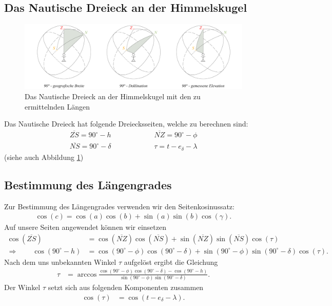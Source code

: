 \begin{refsection}
\subsection{Das Nautische Dreieck an der Himmelskugel}
%
\begin{figure}
\centering
\includegraphics[width=1\textwidth]{kugel/Bestimmung.jpg}
\caption{Das Nautische Dreieck an der Himmelskugel mit den zu
ermittelnden Längen}
\label{NautischeDreieck}
\end{figure}
%
%
Das Nautische Dreieck hat folgende Dreiecksseiten, welche zu berechnen
sind:
\begin{align*}
\overline{ZS} = 90^{\circ} - h \quad \quad \quad \quad \quad \quad 
\overline{NZ} = 90^{\circ} - \phi \\
\overline{NS} = 90^{\circ} - \delta \quad \quad \quad \quad \quad \quad 
\tau = t - e_\delta - \lambda 
\end{align*}
(siehe auch Abbildung \ref{NautischeDreieck})

\subsection{Bestimmung des Längengrades} \label{BestimmungL} 
Zur Bestimmung des Längengrades verwenden wir den Seitenkosinussatz:
\begin{align*}
\cos(c) = \cos(a)\cos(b) + \sin(a)\sin(b)\cos(\gamma).
\end{align*}
Auf unsere Seiten angewendet können wir einsetzen
\begin{align*}
\cos(\overline{ZS}) &= \cos(\overline{NZ}) \cos(\overline{NS}) + \sin(\overline{NZ}) \sin(\overline{NS}) \cos(\tau) \\
\Rightarrow \quad \quad
\cos(90^{\circ} - h) &= \cos(90^{\circ} - \phi) \cos(90^{\circ} - \delta) + \sin(90^{\circ} - \phi)\sin(90^{\circ} - \delta) \cos(\tau).
\end{align*}
Nach dem uns unbekannten Winkel $\tau$ aufgelöst ergibt die Gleichung
\begin{align*}
\tau &= \arccos 
\frac{ \cos(90^{\circ} - \phi) \cos(90^{\circ} - \delta) - \cos(90^{\circ} - h)} {\sin(90^{\circ} - \phi)\sin(90^{\circ} - \delta)}.
\end{align*}
Der Winkel $\tau$ setzt sich aus folgenden Komponenten zusammen
\begin{align*}
\cos (\tau) &= \cos (t - e_\delta - \lambda).
\end{align*}


\end{refsection}
